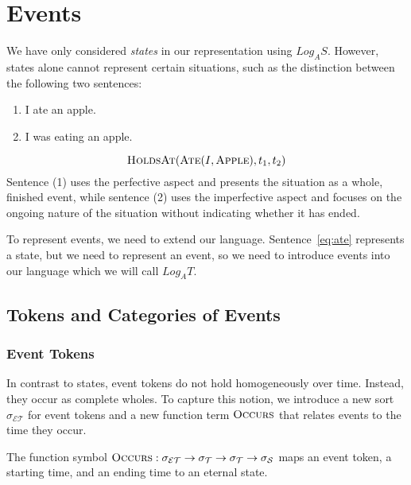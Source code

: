 \chapter{Events}

We have only considered \textit{states} in our representation using $Log_A S$. However, states alone cannot represent certain situations, such as the distinction between the following two sentences:

\begin{enumerate}[label=(\arabic*)]
	\item I ate an apple.
	\item I was eating an apple.
\end{enumerate}

\begin{equation}
	\textsc{HoldsAt}(\textsc{Ate}(I, \textsc{Apple}), t_1, t_2)
	\label{eq:ate}
\end{equation}
Sentence (1) uses the perfective aspect and presents the situation as a whole, finished event, while sentence (2) uses the imperfective aspect and focuses on the ongoing nature of the situation without indicating whether it has ended.

To represent events, we need to extend our language. Sentence~\ref{eq:ate} represents a state, but we need to represent an event, so we need to introduce events into our language
which we will call $Log_A T$.

\section{Tokens and Categories of Events}
\subsection{Event Tokens}

In contrast to states, event tokens do not hold homogeneously over time.
Instead, they occur as complete wholes.
To capture this notion, we introduce a new sort $\sigma_\mathcal{ET}$ for event tokens and a new function term $\textsc{Occurs}$ that relates events to the time they occur.

The function symbol $\textsc{Occurs}: \sigma_\mathcal{ET} \to \sigma_\mathcal{T} \to \sigma_\mathcal{T} \to \sigma_\mathcal{S}$ maps an event token,
a starting time, and an ending time to an eternal state.

